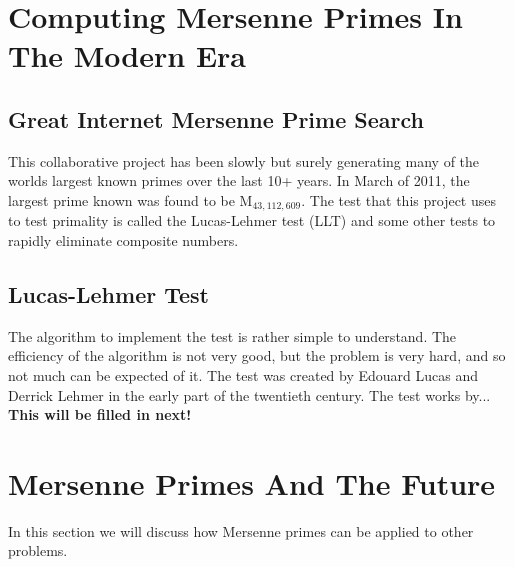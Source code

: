 \section{Computing Mersenne Primes In The Modern Era}
\subsection{Great Internet Mersenne Prime Search}
This collaborative project has been slowly but surely generating many of the worlds largest known primes over the last 10+ years.  In March of 2011, the largest prime known was found to be M$_{43,112,609}$. The test that this project uses to test primality is called the Lucas-Lehmer test (LLT) and some other tests to rapidly eliminate composite numbers.
\subsection{Lucas-Lehmer Test}
The algorithm to implement the test is rather simple to understand.  The efficiency of the algorithm is not very good, but the problem is very hard, and so not much can be expected of it.  The test was created by  Edouard Lucas and Derrick Lehmer in the early part of the twentieth century.  The test works by... \textbf{This will be filled in next!}
\section{Mersenne Primes And The Future}
In this section we will discuss how Mersenne primes can be applied to other problems.
